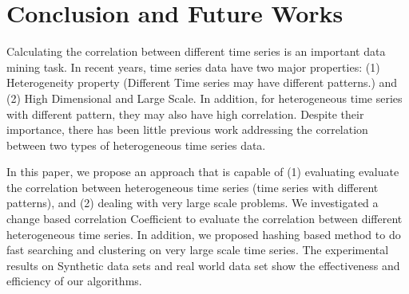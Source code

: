 \section{Conclusion and Future Works}

Calculating the correlation between different time series is an important data mining task. 
In recent years, time series data have two major properties: (1) Heterogeneity property (Different Time series may have different patterns.) and (2) High Dimensional and Large Scale. 
In addition, for heterogeneous time series with different pattern, they may also have high correlation. Despite their importance, there has been little previous work addressing the correlation between two types of heterogeneous time series data.

In this paper, we propose an approach that is capable of (1) evaluating evaluate the correlation between heterogeneous time series (time series with different patterns), and (2) dealing with very large scale problems.
We investigated a change based correlation Coefficient to evaluate the correlation between different heterogeneous time series. In addition, we proposed hashing based method to do fast searching and clustering on very large scale time series.
The experimental results on Synthetic data sets and real world data set show
the effectiveness and efficiency of our algorithms.